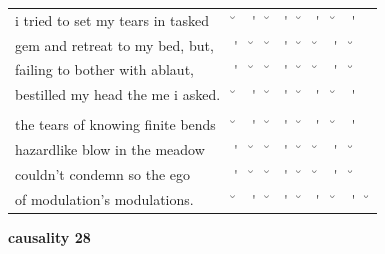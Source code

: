 \documentclass[12pt, landscape]{article}
\begin{document}
\begin{center}
\begin{tabularx}{\textwidth}{
>{\lefting\arraybackslash}X
c
c
c
c
c
c
c
c
c
}

i tried to set my tears in tasked & \u{} & \'{} & \u{} & \'{} & \u{} & \'{} & \u{} & \'{} & \\
gem and retreat to my bed, but, & \'{} & \u{} & \u{} & \'{} & \u{} & \u{} & \'{} & \u{} & \\
failing to bother with ablaut, & \'{} & \u{} & \u{} & \'{} & \u{} & \u{} & \'{} & \u{} & \\
bestilled my head the me i asked. & \u{} & \'{} & \u{} & \'{} & \u{} & \'{} & \u{} & \'{} & \\
 & & & & & & & & \\
the tears of knowing finite bends & \u{} & \'{} & \u{} & \'{} & \u{} & \'{} & \u{} & \'{} & \\
hazardlike blow in the meadow & \'{} & \u{} & \u{} & \'{} & \u{} & \u{} & \'{} & \u{} & \\
couldn't condemn so the ego & \'{} & \u{} & \u{} & \'{} & \u{} & \u{} & \'{} & \u{} & \\
of modulation's modulations. & \u{} & \'{} & \u{} & \'{} & \u{} & \'{} & \u{} & \'{} & \u{} \\

\end{tabularx}
\end{center}

\vspace*{\fill}

\newpage

\vspace*{\fill}

\noindent \textbf{causality 28}
\noindent \hfill \par
\end{document}
